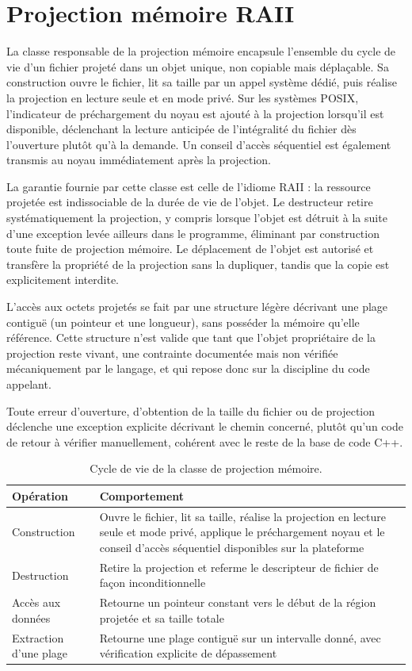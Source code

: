 \documentclass[12pt,a4paper]{report}
\begin{document}
\section{Projection mémoire RAII}
\label{sec:mmap_raii}

La classe responsable de la projection mémoire encapsule l'ensemble du cycle de vie d'un fichier projeté dans un objet unique, non copiable mais déplaçable. Sa construction ouvre le fichier, lit sa taille par un appel système dédié, puis réalise la projection en lecture seule et en mode privé. Sur les systèmes POSIX, l'indicateur de préchargement du noyau est ajouté à la projection lorsqu'il est disponible, déclenchant la lecture anticipée de l'intégralité du fichier dès l'ouverture plutôt qu'à la demande. Un conseil d'accès séquentiel est également transmis au noyau immédiatement après la projection.

La garantie fournie par cette classe est celle de l'idiome RAII : la ressource projetée est indissociable de la durée de vie de l'objet. Le destructeur retire systématiquement la projection, y compris lorsque l'objet est détruit à la suite d'une exception levée ailleurs dans le programme, éliminant par construction toute fuite de projection mémoire. Le déplacement de l'objet est autorisé et transfère la propriété de la projection sans la dupliquer, tandis que la copie est explicitement interdite.

L'accès aux octets projetés se fait par une structure légère décrivant une plage contiguë (un pointeur et une longueur), sans posséder la mémoire qu'elle référence. Cette structure n'est valide que tant que l'objet propriétaire de la projection reste vivant, une contrainte documentée mais non vérifiée mécaniquement par le langage, et qui repose donc sur la discipline du code appelant.

Toute erreur d'ouverture, d'obtention de la taille du fichier ou de projection déclenche une exception explicite décrivant le chemin concerné, plutôt qu'un code de retour à vérifier manuellement, cohérent avec le reste de la base de code C++.

\begin{table}[htbp]
\centering
\renewcommand{\arraystretch}{1.5}
\begin{tabular}{|p{3.4cm}|p{9.6cm}|}
\hline
\textbf{Opération} & \textbf{Comportement} \\
\hline
Construction & Ouvre le fichier, lit sa taille, réalise la projection en lecture seule et mode privé, applique le préchargement noyau et le conseil d'accès séquentiel disponibles sur la plateforme \\
\hline
Destruction & Retire la projection et referme le descripteur de fichier de façon inconditionnelle \\
\hline
Accès aux données & Retourne un pointeur constant vers le début de la région projetée et sa taille totale \\
\hline
Extraction d'une plage & Retourne une plage contiguë sur un intervalle donné, avec vérification explicite de dépassement \\
\hline
\end{tabular}
\caption{Cycle de vie de la classe de projection mémoire.}
\label{tab:mmap_api}
\end{table}
\end{document}
